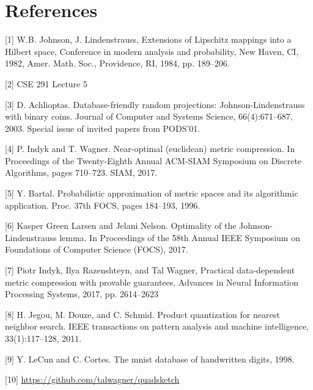 \documentclass{article}
\begin{document}
\section{References}

[1] W.B. Johnson, J. Lindenstrauss, Extensions of Lipschitz mappings into a
Hilbert space, Conference in modern analysis and probability, New Haven, CI,
1982, Amer. Math. Soc., Providence, RI, 1984, pp. 189–206.

[2] CSE 291 Lecture 5

[3] D. Achlioptas. Database-friendly random projections: Johnson-Lindenstrauss
with binary coins. Journal of Computer and Systems Science, 66(4):671–687, 2003.
Special issue of invited papers from PODS’01.

[4] P. Indyk and T. Wagner. Near-optimal (euclidean) metric compression. In
Proceedings of the Twenty-Eighth Annual ACM-SIAM Symposium on Discrete
Algorithms, pages 710–723. SIAM, 2017.

[5] Y. Bartal. Probabilistic approximation of metric spaces and its algorithmic
application. Proc. 37th FOCS, pages 184–193, 1996.

[6] Kasper Green Larsen and Jelani Nelson. Optimality of the
Johnson-Lindenstrauss lemma. In Proceedings of the 58th Annual IEEE Symposium on
Foundations of Computer Science (FOCS), 2017.

[7] Piotr Indyk, Ilya Razenshteyn, and Tal Wagner, Practical data-dependent
metric compression with provable guarantees, Advances in Neural Information
Processing Systems, 2017, pp. 2614–2623

[8] H. Jegou, M. Douze, and C. Schmid. Product quantization for nearest neighbor
search. IEEE transactions on pattern analysis and machine intelligence,
33(1):117–128, 2011.

[9] Y. LeCun and C. Cortes. The mnist database of handwritten digits, 1998.

[10] \url{https://github.com/talwagner/quadsketch}
\end{document}
